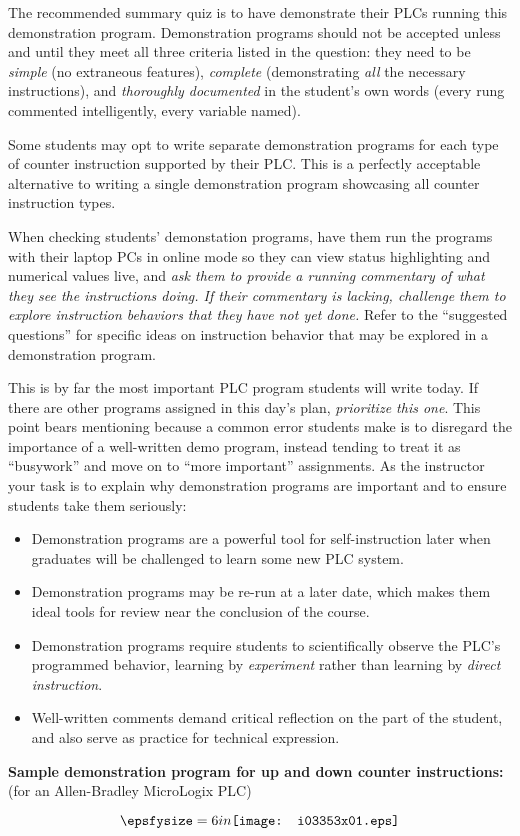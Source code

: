 The recommended summary quiz is to have  demonstrate their PLCs running this demonstration program.  Demonstration programs should not be accepted unless and until they meet all three criteria listed in the question: they need to be {\it simple} (no extraneous features), {\it complete} (demonstrating {\it all} the necessary instructions), and {\it thoroughly documented} in the student's own words (every rung commented intelligently, every variable named).

\vskip 10pt

Some students may opt to write separate demonstration programs for each type of counter instruction supported by their PLC.  This is a perfectly acceptable alternative to writing a single demonstration program showcasing all counter instruction types.

\vskip 10pt

When checking students' demonstation programs, have them run the programs with their laptop PCs in online mode so they can view status highlighting and numerical values live, and {\it ask them to provide a running commentary of what they see the instructions doing.  If their commentary is lacking, challenge them to explore instruction behaviors that they have not yet done.}  Refer to the ``suggested questions'' for specific ideas on instruction behavior that may be explored in a demonstration program.

\vskip 10pt

This is by far the most important PLC program students will write today.  If there are other programs assigned in this day's plan, {\it prioritize this one}.  This point bears mentioning because a common error students make is to disregard the importance of a well-written demo program, instead tending to treat it as ``busywork'' and move on to ``more important'' assignments.  As the instructor your task is to explain why demonstration programs are important and to ensure students take them seriously:

\begin{itemize}
\item{} Demonstration programs are a powerful tool for self-instruction later when graduates will be challenged to learn some new PLC system.
\vskip 5pt
\item{} Demonstration programs may be re-run at a later date, which makes them ideal tools for review near the conclusion of the course.
\vskip 5pt
\item{} Demonstration programs require students to scientifically observe the PLC's programmed behavior, learning by {\it experiment} rather than learning by {\it direct instruction}.
\vskip 5pt
\item{} Well-written comments demand critical reflection on the part of the student, and also serve as practice for technical expression.
\end{itemize}









\vfil \eject

\noindent
{\bf Sample demonstration program for up and down counter instructions:} (for an Allen-Bradley MicroLogix PLC)

$$\epsfysize=6in \texttt{[image: i03353x01.eps]}$$




